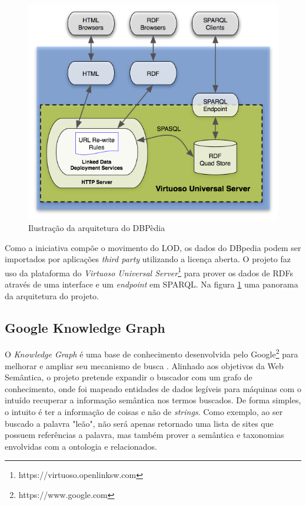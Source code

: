 \begin{figure}
	\centering
	\includegraphics[scale=0.55]{imagens/dbpedia_virtuoso.png}
	\caption{Ilustração da arquitetura do DBPèdia \citep{DBPediaVirtuoso}}
	\label{fig:dbpedia-virtuoso}
\end{figure}

Como a iniciativa compõe o movimento do LOD, os dados do DBpedia podem ser importados por aplicações \textit{third party} utilizando a licença aberta. O projeto faz uso da plataforma do \textit{Virtuoso Universal Server}\footnote{https://virtuoso.openlinksw.com} para prover os dados de RDFs através de uma interface e um \textit{endpoint} em SPARQL. Na figura \ref{fig:dbpedia-virtuoso} uma panorama da arquitetura do projeto.

\subsection{Google Knowledge Graph}

O \textit{Knowledge Graph} é uma base de conhecimento desenvolvida pelo Google\footnote{https://www.google.com} para melhorar e ampliar seu mecanismo de busca \citep{GoogleKnowledge}. Alinhado aos objetivos da Web Semântica, o projeto pretende expandir o buscador com um grafo de conhecimento, onde foi mapeado entidades de dados legíveis para máquinas com o intuído recuperar a informação semântica nos termos buscados. De forma simples, o intuito é ter a informação de coisas e não de \textit{strings}. Como exemplo, ao ser buscado a palavra "leão", não será apenas retornado uma lista de sites que possuem referências a palavra, mas também prover a semântica e taxonomias envolvidas com a ontologia e relacionados.


